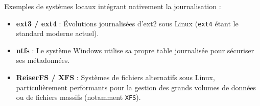 Exemples de systèmes locaux intégrant nativement la journalisation :
\begin{itemize}[label=$\bullet$]
    \item \textbf{ext3 / ext4} : Évolutions journalisées d'ext2 sous Linux (\texttt{ext4} étant le standard moderne actuel).
    \item \textbf{ntfs} : Le système Windows utilise sa propre table journalisée pour sécuriser ses métadonnées.
    \item \textbf{ReiserFS / XFS} : Systèmes de fichiers alternatifs sous Linux, particulièrement performants pour la gestion des grands volumes de données ou de fichiers massifs (notamment \texttt{XFS}).
\end{itemize}